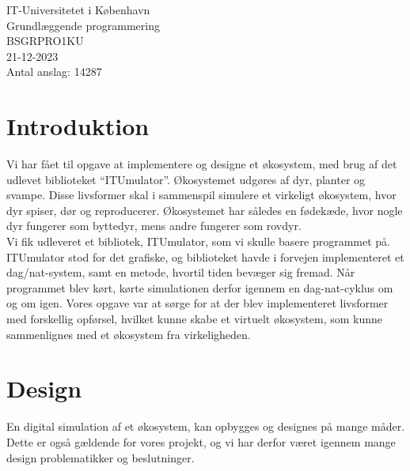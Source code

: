\documentclass[12pt]{article}
\begin{document}
\begin{titlepage}
    \vfill

    IT-Universitetet i København\\
    Grundlæggende programmering \\
    BSGRPRO1KU\\
    21-12-2023 \\
    Antal anslag: 14287 \\
\end{titlepage}

\renewcommand{\contentsname}{Indholdsfortegnelse}
\tableofcontents
\newpage
    \section{Introduktion}
    Vi har fået til opgave at implementere og designe et økosystem, med brug af det udlevet biblioteket “ITUmulator”. Økosystemet udgøres af dyr, planter og svampe. Disse livsformer skal i sammenspil simulere et virkeligt økosystem, hvor dyr spiser, dør og reproducerer. Økosystemet har således en fødekæde, hvor nogle dyr fungerer som byttedyr, mens andre fungerer som rovdyr.
    \\Vi fik udleveret et bibliotek, ITUmulator, som vi skulle basere programmet på. ITUmulator stod for det grafiske, og biblioteket havde i forvejen implementeret et dag/nat-system, samt en metode, hvortil tiden bevæger sig fremad. Når programmet blev kørt, kørte simulationen derfor igennem en dag-nat-cyklus om og om igen. Vores opgave var at sørge for at der blev implementeret livsformer med forskellig opførsel, hvilket kunne skabe et virtuelt økosystem, som kunne sammenlignes med et økosystem fra virkeligheden. 
    \section{Design}
    En digital simulation af et økosystem, kan opbygges og designes på mange måder. Dette er også gældende for vores projekt, og vi har derfor været igennem mange design problematikker og beslutninger.
\end{document}
